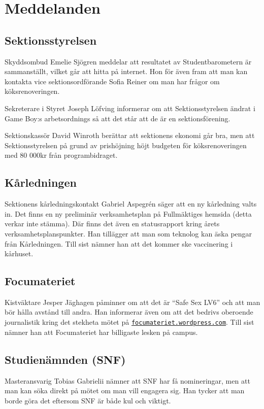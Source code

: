 \documentclass[hidelinks]{sektionsmote}
\begin{document}
\section{Meddelanden}

\subsection{Sektionsstyrelsen}
Skyddsombud Emelie Sjögren meddelar att resultatet av Studentbarometern är sammanställt, vilket går att hitta på internet.
Hon för även fram att man kan kontakta vice sektionsordförande Sofia Reiner om man har frågor om köksrenoveringen.

Sekreterare i Styret Joseph Löfving informerar om att Sektionsstyrelsen ändrat i Game Boy:s arbetsordnings så att det står att de är en sektionsförening.

Sektionskassör David Winroth berättar att sektionens ekonomi går bra, men att Sektionsstyrelsen på grund av prishöjning höjt budgeten för köksrenoveringen med 80 000kr från programbidraget.

\subsection{Kårledningen}
Sektionens kårledningskontakt Gabriel Aspegrén säger att en ny kårledning valts in.
Det finns en ny preliminär verksamhetsplan på Fullmäktiges hemsida (detta verkar inte stämma).
Där finns det även en statusrapport kring årets verksamhetsplanspunkter.
Han tillägger att man som teknolog kan äska pengar från Kårledningen.
Till sist nämner han att det kommer ske vaccinering i kårhuset.

\subsection{Focumateriet}
Kistväktare Jesper Jäghagen påminner om att det är \enquote{Safe Sex LV6} och att man bör hålla avstånd till andra.
Han informerar även om att det bedrivs oberoende journalistik kring det stekheta mötet på \newline\href{https://focumateriet.wordpress.com}{\texttt{focumateriet.wordpress.com}}.
Till sist nämner han att Focumateriet har billigaste lesken på campus.

\subsection{Studienämnden (SNF)}
Masteransvarig Tobias Gabrielii nämner att SNF har få nomineringar, men att man kan söka direkt på mötet om man vill engagera sig.
Han tycker att man borde göra det eftersom SNF är både kul och viktigt.
\end{document}
